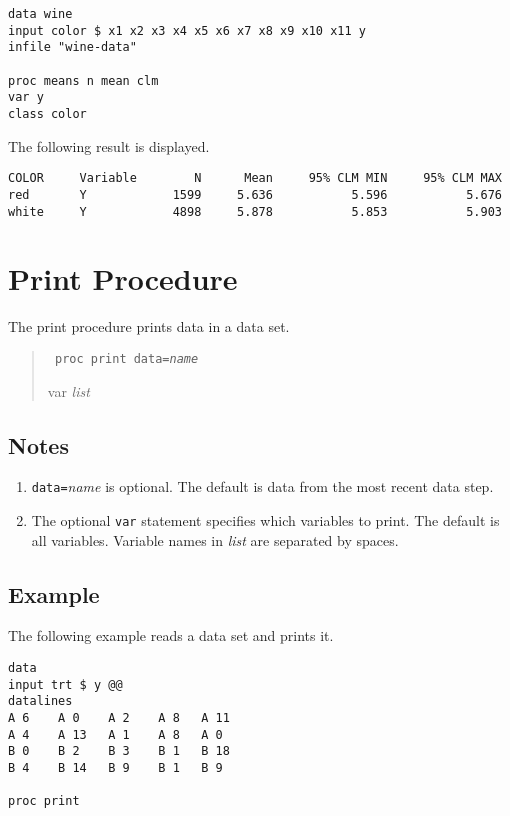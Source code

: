 \documentclass[12pt]{article}
\begin{document}
\begin{Verbatim}
data wine
input color $ x1 x2 x3 x4 x5 x6 x7 x8 x9 x10 x11 y
infile "wine-data"

proc means n mean clm
var y
class color
\end{Verbatim}

The following result is displayed.

\begin{Verbatim}
COLOR     Variable        N      Mean     95% CLM MIN     95% CLM MAX
red       Y            1599     5.636           5.596           5.676
white     Y            4898     5.878           5.853           5.903
\end{Verbatim}

\newpage

\section{Print Procedure}
The print procedure prints data in a data set.

\begin{quote}
{\tt
proc print data={\it name}

var {\it list}
}
\end{quote}

\subsection*{Notes}
\begin{enumerate}
\item
{\tt data=}{\it name} is optional.
The default is data from the most recent data step.
\item
The optional {\tt var} statement specifies which variables
to print.
The default is all variables.
Variable names in {\it list} are separated by spaces.
\end{enumerate}

\subsection*{Example}
The following example reads a data set
and prints it.

\begin{Verbatim}
data
input trt $ y @@
datalines
A 6    A 0    A 2    A 8   A 11
A 4    A 13   A 1    A 8   A 0
B 0    B 2    B 3    B 1   B 18
B 4    B 14   B 9    B 1   B 9

proc print
\end{Verbatim}
\end{document}

